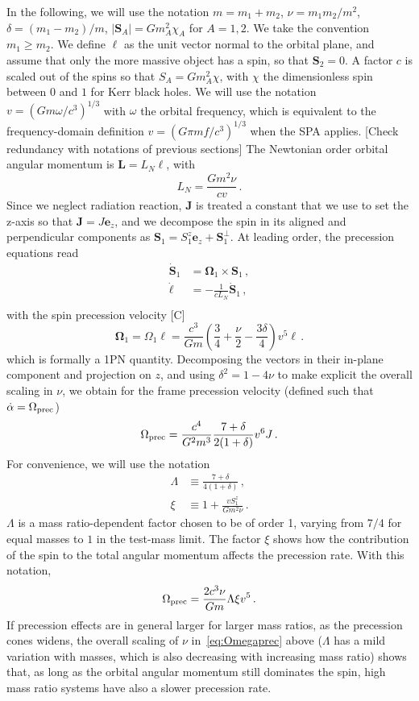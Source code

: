 \documentclass[aps,showpacs,twocolumn,
prd,superscriptaddress,nofootinbib]{revtex4-1}
\newcommand{\be}{\begin{equation}}
\newcommand{\ee}{\end{equation}}
\newcommand{\nn}{\nonumber}
\newcommand{\SM}[1]{{\color{Red} #1}}
\begin{document}
In the following, we will use the notation $m=m_{1}+m_{2}$, $\nu=m_{1}m_{2}/m^{2}$, $\delta = (m_{1}-m_{2})/m$, $|\bm{S}_{A}|=Gm_{A}^{2} \chi_{A}$ for $A=1,2$. We take the convention $m_{1} \geq m_{2}$. We define $\bm{\ell}$ as the unit vector normal to the orbital plane, and assume that only the more massive object has a spin, so that $\bm{S}_{2} = 0$. A factor $c$ is scaled out of the spins so that $S_{A} = G m_{A}^{2} \chi$, with $\chi$ the dimensionless spin between $0$ and $1$ for Kerr black holes. We will use the notation $v = (G m \omega/c^{3})^{1/3}$ with $\omega$ the orbital frequency, which is equivalent to the frequency-domain definition $v=(G \pi m f/c^{3})^{1/3}$ when the SPA applies. \SM{[Check redundancy with notations of previous sections]} The Newtonian order orbital angular momentum is $\bm{L} = L_{N} \bm{\ell}$, with
\be\label{eq:defLN}
	L_{N} = \frac{G m^{2} \nu}{c v} \,.
\ee
Since we neglect radiation reaction, $\bm{J}$ is treated a constant that we use to set the z-axis so that $\bm{J} = J \bm{e}_{z}$, and we decompose the spin in its aligned and perpendicular components as $\bm{S}_{1} = S_{1}^{z} \bm{e}_{z} + \bm{S}_{1}^{\perp}$. At leading order, the precession equations read
\begin{align}
	\dot{\bm{S}}_{1} &= \bm{\Omega}_{1} \times \bm{S}_{1} \,, \nn\\
	\dot{\bm{\ell}} &= - \frac{1}{c L_{N}}  \dot{\bm{S}}_{1}\,, \nn\\
\end{align}
with the spin precession velocity \cite{} \SM{[C]}
\be
	\bm{\Omega}_{1} = \Omega_{1} \bm{\ell} = \frac{c^{3}}{G m} \left( \frac{3}{4} + \frac{\nu}{2} - \frac{3\delta}{4} \right) v^{5} \bm{\ell} \,.
\ee
which is formally a 1PN quantity. Decomposing the vectors in their in-plane component and projection on $z$, and using $\delta^{2} = 1-4\nu$ to make explicit the overall scaling in $\nu$, we obtain for the frame precession velocity (defined such that $\dot{\alpha} = \Omega_{\rm prec}$)
\be
	\Omega_{\rm prec} = \frac{c^{4}}{G^{2} m^{3}} \frac{7+\delta}{2(1+\delta)} v^{6} J\,.
\ee
For convenience, we will use the notation
\begin{subequations}
\begin{align}
	\Lambda &\equiv \frac{7+\delta}{4(1+\delta)} \,, \\
	\xi &\equiv 1 + \frac{v S_{1}^{z}}{G m^{2} \nu} \,.
\end{align}
\end{subequations}
$\Lambda$ is a mass ratio-dependent factor chosen to be of order 1, varying from $7/4$ for equal masses to $1$ in the test-mass limit. The factor $\xi$ shows how the contribution of the spin to the total angular momentum affects the precession rate. With this notation,
\be\label{eq:Omegaprec}
	\Omega_{\rm prec} = \frac{2c^{3} \nu}{G m} \Lambda \xi v^{5} \,.
\ee
If precession effects are in general larger for larger mass ratios, as the precession cones widens, the overall scaling of $\nu$ in~\eqref{eq:Omegaprec} above ($\Lambda$ has a mild variation with masses, which is also decreasing with increasing mass ratio) shows that, as long as the orbital angular momentum still dominates the spin, high mass ratio systems have also a slower precession rate.
\end{document}
